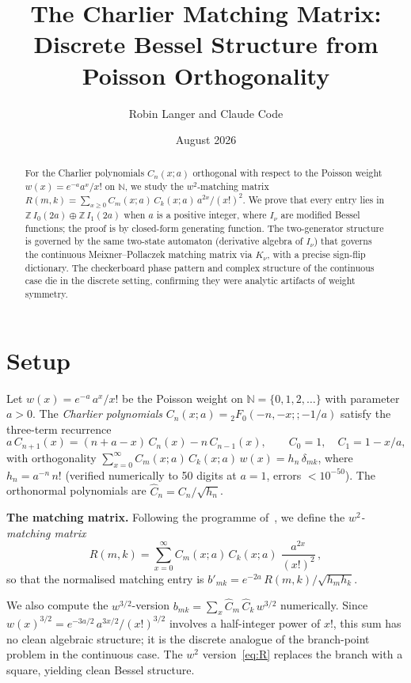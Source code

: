 \documentclass[11pt,a4paper]{article}
\title{\textbf{The Charlier Matching Matrix:\\
Discrete Bessel Structure from Poisson Orthogonality}}
\author{Robin Langer and Claude Code}
\date{August 2026}
\newcommand{\Z}{\mathbb{Z}}
\newcommand{\N}{\mathbb{N}}
\begin{document}
\maketitle

\begin{abstract}
For the Charlier polynomials $C_n(x;a)$ orthogonal with respect to
the Poisson weight $w(x) = e^{-a} a^x/x!$ on $\N$, we study the
$w^2$-matching matrix $R(m,k) = \sum_{x \ge 0} C_m(x;a)\, C_k(x;a)\,
a^{2x}/(x!)^2$. We prove that every entry lies in
$\Z\, I_0(2a) \oplus \Z\, I_1(2a)$ when $a$ is a positive integer,
where $I_\nu$ are modified Bessel functions; the proof is by closed-form
generating function. The two-generator structure is governed by the
same two-state automaton (derivative algebra of $I_\nu$) that governs
the continuous Meixner--Pollaczek matching matrix via $K_\nu$, with a
precise sign-flip dictionary. The checkerboard phase pattern and
complex structure of the continuous case die in the discrete setting,
confirming they were analytic artifacts of weight symmetry.
\end{abstract}

\section{Setup}

Let $w(x) = e^{-a}\, a^x / x!$ be the Poisson weight on $\N = \{0,1,2,\ldots\}$
with parameter $a > 0$. The \emph{Charlier polynomials}
$C_n(x;a) = {}_2F_0(-n,-x;{};-1/a)$ satisfy the three-term recurrence
\[
  a\, C_{n+1}(x) = (n + a - x)\, C_n(x) - n\, C_{n-1}(x),
  \qquad C_0 = 1,\quad C_1 = 1 - x/a,
\]
with orthogonality $\sum_{x=0}^\infty C_m(x;a)\, C_k(x;a)\, w(x)
= h_n\, \delta_{mk}$, where $h_n = a^{-n}\, n!$ (verified numerically
to 50 digits at $a=1$, errors $< 10^{-50}$). The orthonormal
polynomials are $\widehat{C}_n = C_n / \sqrt{h_n}$.

\textbf{The matching matrix.} Following the programme of~\cite{mp},
we define the \emph{$w^2$-matching matrix}
\begin{equation}\label{eq:R}
  R(m,k) = \sum_{x=0}^\infty C_m(x;a)\, C_k(x;a)\;
  \frac{a^{2x}}{(x!)^2}\,,
\end{equation}
so that the normalised matching entry is
$b'_{mk} = e^{-2a}\, R(m,k) / \sqrt{h_m h_k}$.

We also compute the $w^{3/2}$-version
$b_{mk} = \sum_x \widehat{C}_m\, \widehat{C}_k\, w^{3/2}$
numerically. Since $w(x)^{3/2} = e^{-3a/2}\, a^{3x/2} / (x!)^{3/2}$
involves a half-integer power of $x!$, this sum has no clean algebraic
structure; it is the discrete analogue of the branch-point problem in
the continuous case. The $w^2$ version~\eqref{eq:R} replaces the
branch with a square, yielding clean Bessel structure.
\end{document}
